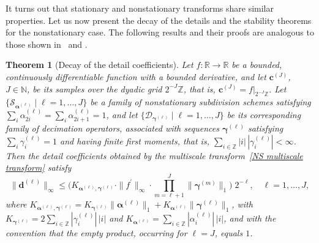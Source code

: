 \documentclass[11pt,a4paper]{article}
\newtheorem{theorem}{Theorem}[section]
\theoremstyle{definition}
\begin{document}
It turns out that stationary and nonstationary transforms share similar properties. Let us now present the decay of the details and the stability theorems for the nonstationary case. The following results and their proofs are analogous to those shown in~\cite{mattar2023pyramid} and \cite{dyn2021linear}.

\begin{theorem}[Decay of the detail coefficients]\label{thm. details decay}
Let $f\colon \mathbb{R} \rightarrow \mathbb{R}$ be a bounded, continuously differentiable function with a bounded derivative, and let $\boldsymbol{c}^{(J)}$, $J \in \mathbb{N}$, be its samples over the dyadic grid $2^{-J}\mathbb{Z}$, that is, $\boldsymbol{c}^{(J)}=f|_{2^{-J}\mathbb{Z}}$. Let $\{\mathcal{S}_{\boldsymbol{\alpha}^{(\ell)}} \mid \ell=1,\dots,J\}$ be a family of nonstationary subdivision schemes satisfying $\sum_{i}\alpha^{(\ell)}_{2i}=\sum_{i}\alpha^{(\ell)}_{2i+1}=1$, and let $\{\mathcal{D}_{\boldsymbol{\gamma}^{(\ell)}} \mid \ell=1,\dots,J\}$ be its corresponding family of decimation operators, associated with sequences $\boldsymbol{\gamma}^{(\ell)}$ satisfying $\sum_i \gamma^{(\ell)}_i = 1$ and having finite first moments, that is, $\sum_{i\in\mathbb{Z}}|i|\,|\gamma^{(\ell)}_i|<\infty$. Then the detail coefficients obtained by the multiscale transform~\eqref{NS multiscale transform} satisfy
\begin{equation}\label{details bound}
    \|\boldsymbol{d}^{(\ell)}\|_\infty \leq \bigg(K_{\boldsymbol{\alpha}^{(\ell)},\boldsymbol{\gamma}^{(\ell)}} \cdot \|f^\prime\|_\infty \cdot \prod_{m=\ell+1}^J \|\boldsymbol{\gamma}^{(m)}\|_1 \bigg) \; 2^{-\ell}, \quad \ell=1,\dots,J,
\end{equation}
where $K_{\boldsymbol{\alpha}^{(\ell)},\boldsymbol{\gamma}^{(\ell)}}=K_{\boldsymbol{\gamma}^{(\ell)}}\|\boldsymbol{\alpha}^{(\ell)}\|_1+ K_{\boldsymbol{\alpha}^{(\ell)}}\|\boldsymbol{\gamma}^{(\ell)}\|_1$, with $K_{\boldsymbol{\gamma}^{(\ell)}}=2\sum_{i\in\mathbb{Z}} |\gamma^{(\ell)}_i|\,|i|$ and $K_{\boldsymbol{\alpha}^{(\ell)}}=\sum_{i\in\mathbb{Z}} |\alpha^{(\ell)}_i|\,|i|$, and with the convention that the empty product, occurring for $\ell=J$, equals $1$.
\end{theorem}
\end{document}

